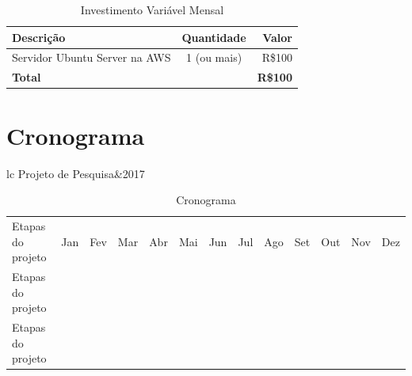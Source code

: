 \documentclass[
	12pt,
	oneside,
	a4paper,
	english,
	brazil,
]{abntex2}
\begin{document}
\begin{table}[ht]
\caption{Investimento Variável Mensal}
\centering
\begin{tabular}{l c r}
\hline\hline
Descrição & Quantidade &Valor \\ [0.5ex]
\hline
Servidor Ubuntu Server na AWS &1 (ou mais)&R\$100 \\
\hline
\textbf{Total}&&\textbf{R\$100} \\ [1ex]
\end{tabular}
\label{table:nonlin}
\end{table}



\chapter{Cronograma}

\begin{table}[ht]
\caption{Cronograma}
\centering
\begin{tabular}{lc}
    \hline
    Projeto de Pesquisa&2017 \\ [0.5ex]
    \hline
    \begin{tabular}{lcccccccccccc}
    Etapas do projeto& \cellcolor{blue!25} Jan&Fev&Mar&Abr&Mai&Jun&Jul&Ago&Set&Out&Nov&Dez \\
    Etapas do projeto&&&&&&&&&&&& \\
    Etapas do projeto&&&&&&&&&&&& \\
    \end{tabular}
\end{tabular}
\label{table:nonlin}
\end{table}


\postextual



%
%
\end{document}
